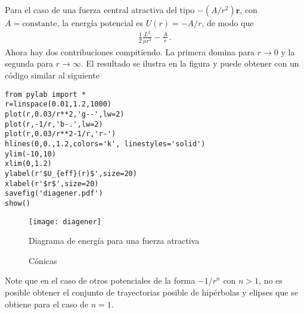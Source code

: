 Para el caso de una fuerza central atractiva del tipo $-(A/r^2)\hat{\mathbf{r}}$, con $A=\text{constante}$, la energía potencial es $U(r)=-A/r$, de modo que
\begin{align}
  \frac{1}{2}\frac{L^2}{\mu r^2}-\frac{A}{r}\,.
\end{align}
Ahora hay dos contribuciones compitiendo. La primera domina para $r\to 0$ y la segunda para $r\to \infty$. El resultado se ilustra en la figura y puede obtener con un código similar al siguiente
\begin{lstlisting}
from pylab import *
r=linspace(0.01,1.2,1000)
plot(r,0.03/r**2,'g--',lw=2)
plot(r,-1/r,'b-.',lw=2)
plot(r,0.03/r**2-1/r,'r-')
hlines(0,0.,1.2,colors='k', linestyles='solid')
ylim(-10,10)
xlim(0,1.2)
ylabel(r'$U_{eff}(r)$',size=20)
xlabel(r'$r$',size=20)
savefig('diagener.pdf')
show()
\end{lstlisting}
\begin{frame}
  
\begin{figure}
  \centering
  \texttt{[image: diagener]}
  \caption{Diagrama de energía para una fuerza atractiva}
  \label{fig:diagener}
\end{figure}
\end{frame}
\begin{frame}  
\begin{figure}
  \centering
  \caption{Cónicas}
  \label{fig:conicas}
\end{figure}
\end{frame}

Note que en el caso de otros potenciales de la forma $-1/r^n$ con $n>1$, no es posible obtener el conjunto de trayectorias posible de hipérbolas y elipses que se obtiene para el caso de $n=1$.

